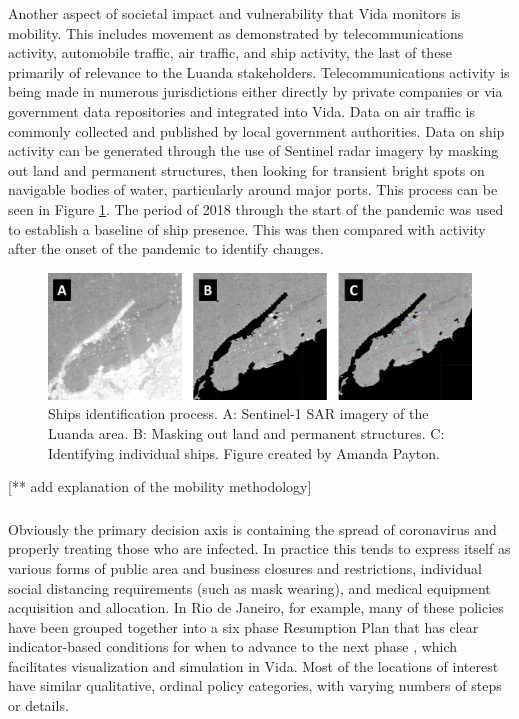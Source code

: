 Another aspect of societal impact and vulnerability that Vida monitors is mobility. This includes movement as demonstrated by telecommunications activity, automobile traffic, air traffic, and ship activity, the last of these primarily of relevance to the Luanda stakeholders. Telecommunications activity is being made in numerous jurisdictions either directly by private companies \cite{googleCOVID19CommunityMobility} or via government data repositories \cite{ministeriodecienciatecnologiaconocimientoeinnovacionDatosCOVID192021} and integrated into Vida. Data on air traffic is commonly collected and published by local government authorities. Data on ship activity can be generated through the use of Sentinel radar imagery by masking out land and permanent structures, then looking for transient bright spots on navigable bodies of water, particularly around major ports. This process can be seen in Figure \ref{fig:ships}. The period of 2018 through the start of the pandemic was used to establish a baseline of ship presence. This was then compared with activity after the onset of the pandemic to identify changes. 

\begin{figure}[h]
	\centering
	\includegraphics[scale=0.35]{Figures/chap5/ships.pdf}
	\caption[Ships identification process]{Ships identification process. A: Sentinel-1 SAR imagery of the Luanda area. B: Masking out land and permanent structures. C: Identifying individual ships. Figure created by Amanda Payton.}
	\label{fig:ships}
\end{figure}

[** add explanation of the mobility methodology]


\subsubsection{}

Obviously the primary decision axis is containing the spread of coronavirus and properly treating those who are infected. In practice this tends to express itself as various forms of public area and business closures and restrictions, individual social distancing requirements (such as mask wearing), and medical equipment acquisition and allocation. In Rio de Janeiro, for example, many of these policies have been grouped together into a six phase Resumption Plan that has clear indicator-based conditions for when to advance to the next phase \cite{iplanrioIndicadoresPlanoRetomada2020}, which facilitates visualization and simulation in Vida. Most of the locations of interest have similar qualitative, ordinal policy categories, with varying numbers of steps or details. 

